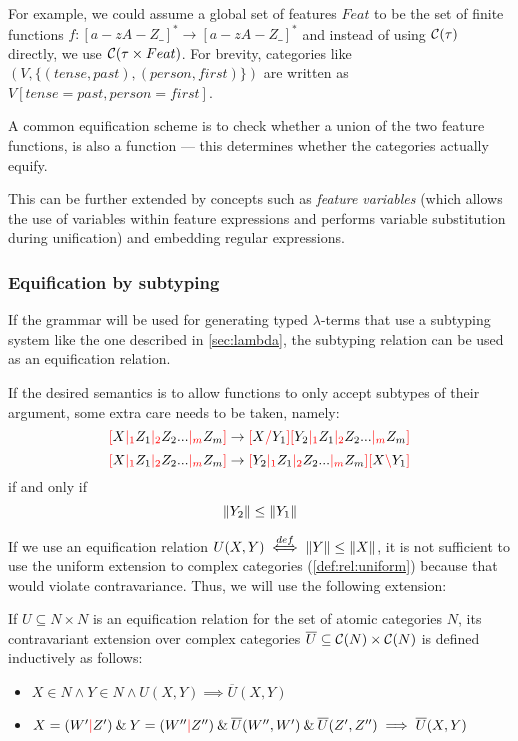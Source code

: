 \documentclass[main.tex]{subfiles}
\begin{document}
For example, we could assume a global set of features $Feat$ to be the
set of finite functions $f: [a-zA-Z\_]^* \rightarrow [a-zA-Z\_]^*$
and instead of using $\mathcal{C}( \tau )$ directly, we use $\mathcal{C}( \tau \times Feat )$.
For brevity, categories like $(V, \{ (tense, past), (person, first) \})$
are written as $V[tense=past, person=first]$.

A common equification scheme is to check whether a union of the two feature functions,
is also a function --- this determines whether the categories actually equify.

This can be further extended by concepts such as \emph{feature variables}
(which allows the use of variables within feature expressions and
performs variable substitution during unification) and embedding regular expressions.

\subsubsection{Equification by subtyping}\label{hack:subtyping}
If the grammar will be used for generating typed $\lambda$-terms that use
a subtyping system like the one described in \cref{sec:lambda}, the subtyping
relation can be used as an equification relation.

If the desired semantics is to allow functions to only accept subtypes of
their argument, some extra care needs to be taken, namely:
\[ \textcolor{red}{[} X \textcolor{red}{|_{1}} Z_1 \textcolor{red}{|_{2}} Z_2 ... \textcolor{red}{|_{m}} Z_m \textcolor{red}{]} \rightarrow \textcolor{red}{[} X \textcolor{red}{/} Y_1 \textcolor{red}{]} \textcolor{red}{[} Y_2 \textcolor{red}{|_{1}} Z_1 \textcolor{red}{|_{2}} Z_2 ... \textcolor{red}{|_{m}} Z_m \textcolor{red}{]} \]
\[ \textcolor{red}{[} X \textcolor{red}{|_{1}} Z_1 \textcolor{red}{|_{2}} Z_2 ... \textcolor{red}{|_{m}} Z_m \textcolor{red}{]} \rightarrow \textcolor{red}{[} Y_2 \textcolor{red}{|_{1}} Z_1 \textcolor{red}{|_{2}} Z_2 ... \textcolor{red}{|_{m}} Z_m \textcolor{red}{]} \textcolor{red}{[} X \textcolor{red}{\backslash} Y_1 \textcolor{red}{]} \]
if and only if
\begin{equation}\label{eq:typeless}
    \|Y_2\| \leq \|Y_1\|
\end{equation}

If we use an equification relation $U(X, Y) \overset{def}{\iff} \|Y\| \leq \|X\|$,
it is not sufficient to use the uniform extension to complex categories
(\cref{def:rel:uniform}) because that would violate contravariance. Thus,
we will use the following extension:
\begin{defn}
    If $U \subseteq N \times N$ is an equification relation
    for the set of
    atomic categories $N$, its contravariant extension over complex categories
    $\overline{U} \subseteq \mathcal{C}( N ) \times \mathcal{C}( N )$ is defined
    inductively as follows:
    \begin{itemize}
        \item $X \in N \land Y \in N \land U(X, Y) \implies \overline{U}(X, Y)$
        \item $X = (W' \textcolor{red}{|} Z') \mathbin{\&} Y = (W'' \textcolor{red}{|} Z'') \mathbin{\&} \overline{U}(W'', W')
        \mathbin{\&} \overline{U}(Z', Z'')\implies \overline{U}(X, Y)$
    \end{itemize}
\end{defn}
\end{document}
